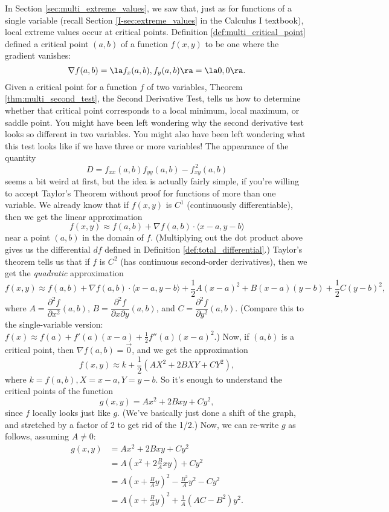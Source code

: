 In Section \ref{sec:multi_extreme_values}, we saw that, just as for functions of a single variable (recall Section \ref{I-sec:extreme_values} in the Calculus I textbook), local extreme values occur at critical points. 
Definition \ref{def:multi_critical_point} defined a critical point $(a,b)$ of a function $f(x,y)$  to be one where the gradient vanishes:
\[
\nabla f(a,b) = \la f_x(a,b),f_y(a,b)\ra = \la 0,0\ra.
\]
Given a critical point for a function $f$ of two variables, Theorem \ref{thm:multi_second_test}, the Second Derivative Test, tells us how to determine whether that critical point corresponds to a local minimum, local maximum, or saddle point. You might have been left wondering why the second derivative test looks so different in two variables. You might also have been left wondering what this test looks like if we have three or more variables!
The appearance of the quantity 
\[
D = f_{xx}(a,b)f_{yy}(a,b)-f_{xy}^{\,2}(a,b)
\]
seems a bit weird at first, but the idea is actually fairly simple, if you're willing to accept Taylor's Theorem without proof for functions of more than one variable. We already know that if $f(x,y)$ is $C^1$ (continuously differentiable), then we get the linear approximation
\[
f(x,y) \approx f(a,b) +\nabla f(a,b)\cdot\langle x-a,y-b\rangle
\]
near a point $(a,b)$ in the domain of $f$. (Multiplying out the dot product above gives us the differential $df$ defined in Definition \ref{def:total_differential}.) Taylor's theorem tells us that if $f$ is $C^2$ (has continuous second-order derivatives), then we get the {\em quadratic} approximation
\[
f(x,y) \approx f(a,b) + \nabla f(a,b)\cdot \langle x-a,y-b\rangle +\frac{1}{2}A(x-a)^2+B(x-a)(y-b)+\frac{1}{2}C(y-b)^2,
\]
where $A = \dfrac{\partial ^2 f}{\partial x^2}(a,b)$, $B = \dfrac{\partial^2 f}{\partial x\partial y}(a,b)$, and $C =\dfrac{\partial^2 f}{\partial y^2}(a,b)$. (Compare this to the single-variable version: $f(x)\approx f(a) + f'(a)(x-a)+\frac{1}{2}f''(a)(x-a)^2$.) Now, if $(a,b)$ is a critical point, then $\nabla f(a,b)=\vec{0}$, and we get the approximation
\[
f(x,y) \approx k+ \frac{1}{2}\left(AX^2+2BXY+CY^2\right),
\]
where $k=f(a,b), X=x-a, Y=y-b$. So it's enough to understand the critical points of the function
\[
g(x,y) = Ax^2+2Bxy+Cy^2,
\]
since $f$ locally looks just like $g$. (We've basically just done a shift of the graph, and stretched by a factor of 2 to get rid of the 1/2.) Now, we can re-write $g$ as follows, assuming $A\neq 0$:
\begin{align*}
g(x,y) & = Ax^2+2Bxy+Cy^2\\
& = A(x^2+2\frac{B}{A}xy) + Cy^2\\
& = A(x+\frac{B}{A}y)^2 - \frac{B^2}{A}y^2-Cy^2\\
& = A(x+\frac{B}{A}y)^2 + \frac{1}{A}(AC-B^2)y^2.
\end{align*}
